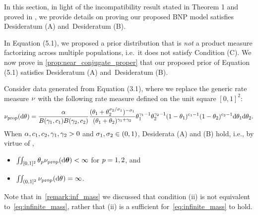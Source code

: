 
In this section, in light of the incompatibility result stated in Theorem 1 and proved in , we provide details on proving our proposed BNP model satisfies Desideratum (A) and~Desideratum (B).

In Equation (5.1), we proposed a prior distribution that is \emph{not} a product measure factorizing across multiple populations, i.e.\ it does not satisfy Condition (C).
We now prove in \cref{prop:near_conjugate_proper} that our proposed prior of Equation (5.1)  satisfies Desideratum (A) and~Desideratum (B). 

\begin{myProposition}
    \label{prop:near_conjugate_proper}
    Consider data generated from Equation (3.1), where we replace the generic rate measure $\nu$ with the following rate measure defined on the unit square $[0,1]^2$:
\begin{equation}
    	\ratemeasproposed(\de\vecvariantfreq{})=\frac{\mass}{B(\corr{1},\conc{1})B(\corr{2},\conc{2})}\frac{(\variantfreqperpop{1}+\variantfreqperpop{2}^{\rate{2}/\rate{1}})^{-\rate{1}}}{(\variantfreqperpop{1}+\variantfreqperpop{2})^{\corr{1}+\corr{2}}}\variantfreqperpop{1}^{\corr{1}-1}\variantfreqperpop{2}^{\corr{2}-1}(1-\variantfreqperpop{1})^{\conc{1}-1}(1-\variantfreqperpop{2})^{\conc{2}-1} \de \variantfreqperpop{1} \de \variantfreqperpop{2}. \label{eq:proposed_levy}
    \end{equation}
    When $\alpha,c_{1},c_{2}, \gamma_{1},\gamma_{2}>0$ and $\sigma_{1},\sigma_{2}\in (0,1)$, Desiderata (A) and (B) hold, i.e., by virtue of ,
    \begin{itemize}
    	\item[(i)] $\iint_{[0,1]^2}\theta_{p}\nu_{\mathrm{prop}}(\mathrm{d}\boldsymbol{\theta})<\infty$ for $p=1,2$, and
    	\item[(ii)] $\iint_{(0,1]^2}\ratemeasproposed(\de \vecvariantfreq{})=\infty$.
	\end{itemize} 
\end{myProposition}

Note that in~\cref{remark:inf_mass} we discussed that condition (ii) is not equivalent to~\cref{eq:infinite_mass}, rather that (ii) is a sufficient for~\cref{eq:infinite_mass} to hold.

